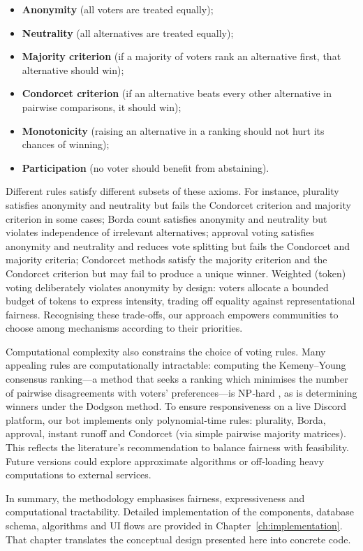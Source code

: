 \begin{itemize}
    \item \textbf{Anonymity} (all voters are treated equally);
    \item \textbf{Neutrality} (all alternatives are treated equally);
    \item \textbf{Majority criterion} (if a majority of voters rank an
    alternative first, that alternative should win);
    \item \textbf{Condorcet criterion} (if an alternative beats every
    other alternative in pairwise comparisons, it should win);
    \item \textbf{Monotonicity} (raising an alternative in a ranking
    should not hurt its chances of winning);
    \item \textbf{Participation} (no voter should benefit from abstaining).
\end{itemize}
Different rules satisfy different subsets of these axioms.  For
instance, plurality satisfies anonymity and neutrality but fails the
Condorcet criterion and majority criterion in some cases; Borda count
satisfies anonymity and neutrality but violates independence of irrelevant
alternatives; approval voting satisfies anonymity and neutrality and
reduces vote splitting but fails the Condorcet and majority criteria;
Condorcet methods satisfy the majority criterion and the Condorcet
criterion but may fail to produce a unique winner.  Weighted (token)
voting deliberately violates anonymity by design: voters allocate a
bounded budget of tokens to express intensity, trading off equality
against representational fairness.  Recognising these trade‑offs, our
approach empowers communities to choose among mechanisms according to
their priorities.

Computational complexity also constrains the choice of voting rules.
Many appealing rules are computationally intractable: computing the
Kemeny–Young consensus ranking—a method that seeks a ranking which minimises the number of pairwise disagreements with voters' preferences—is NP‑hard \cite{Bartholdi1989}, as is determining winners
under the Dodgson method.  To ensure responsiveness on a live Discord
platform, our bot implements only polynomial‑time rules: plurality,
Borda, approval, instant runoff and Condorcet (via simple pairwise
majority matrices).  This reflects the literature’s recommendation to
balance fairness with feasibility.  Future versions could explore
approximate algorithms or off‑loading heavy computations to external
services.

In summary, the methodology emphasises fairness, expressiveness and
computational tractability.  Detailed implementation of the components,
database schema, algorithms and UI flows are provided in
Chapter~\ref{ch:implementation}.  That chapter translates the
conceptual design presented here into concrete code.

